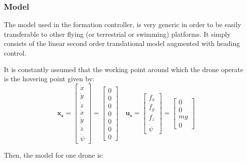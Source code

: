\documentclass[a4paper, 12pt]{report}
\begin{document}
\subsubsection{Model}
The model used in the formation controller, is very generic in order to be easily transferable to other flying (or terrestrial or swimming) platforms. It simply consists of the linear second order translational model augmented with heading control. 

It is constantly assumed that the working point around which the drone operate is  the hovering point given by:
\[\boldsymbol{x_s} = \begin{bmatrix}\dot x \\ \dot y \\ \dot z \\ \ddot x \\ \ddot y \\ \ddot z \\ \dot \psi\end{bmatrix} = \begin{bmatrix} 0 \\ 0 \\ 0 \\ 0 \\ 0 \\ 0 \\ 0\end{bmatrix} \quad \boldsymbol{u_s} = \begin{bmatrix} f_x \\ f_y \\ f_z \\ \dot \psi \end{bmatrix} = \begin{bmatrix}  0\\ 0\\ mg \\ 0\end{bmatrix} \]

Then, the model for one drone is:
\end{document}

